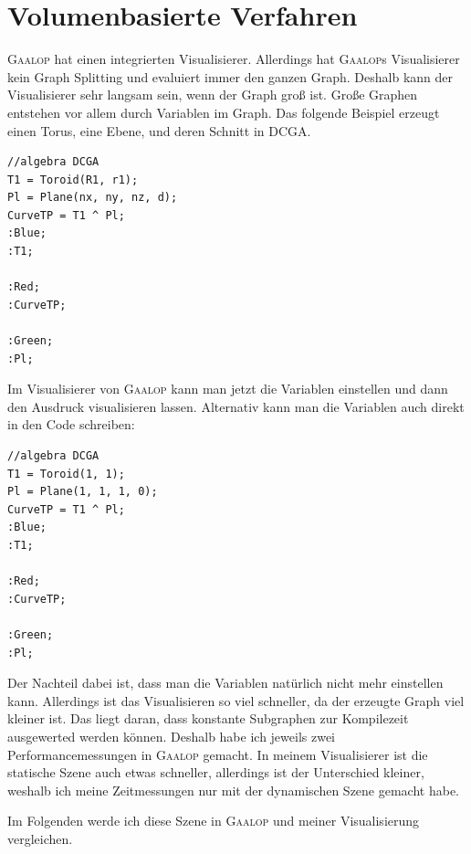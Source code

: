 \documentclass[
	ngerman,%
	accentcolor=9c,%
	ruledheaders=section,%
	class=report,%
	thesis={type=bachelor},%
	fontsize=11pt,%
	parskip=half-,%
	custommargins=true,%
	marginpar=false,%
]{tudapub}
\begin{document}
\section{Volumenbasierte Verfahren}
\textsc{Gaalop} hat einen integrierten Visualisierer. Allerdings hat \textsc{Gaalop}s Visualisierer kein Graph Splitting und evaluiert immer den ganzen Graph. Deshalb kann der Visualisierer sehr langsam sein, wenn der Graph groß ist. Große Graphen entstehen vor allem durch Variablen im Graph. Das folgende Beispiel erzeugt einen Torus, eine Ebene, und deren Schnitt in DCGA.
\begin{verbatim}
//algebra DCGA
T1 = Toroid(R1, r1);                
Pl = Plane(nx, ny, nz, d);    
CurveTP = T1 ^ Pl;     
:Blue;
:T1;

:Red;
:CurveTP;

:Green;
:Pl;     
\end{verbatim}
Im Visualisierer von \textsc{Gaalop} kann man jetzt die Variablen einstellen und dann den Ausdruck visualisieren lassen.
Alternativ kann man die Variablen auch direkt in den Code schreiben:
\begin{verbatim}
//algebra DCGA
T1 = Toroid(1, 1);                
Pl = Plane(1, 1, 1, 0);    
CurveTP = T1 ^ Pl;     
:Blue;
:T1;

:Red;
:CurveTP;

:Green;
:Pl;     
\end{verbatim}
Der Nachteil dabei ist, dass man die Variablen natürlich nicht mehr einstellen kann. Allerdings ist das Visualisieren so viel schneller, da der erzeugte Graph viel kleiner ist. Das liegt daran, dass konstante Subgraphen zur Kompilezeit ausgewerted werden können. Deshalb habe ich jeweils zwei Performancemessungen in \textsc{Gaalop} gemacht. In meinem Visualisierer ist die statische Szene auch etwas schneller, allerdings ist der Unterschied kleiner, weshalb ich meine Zeitmessungen nur mit der dynamischen Szene gemacht habe.

Im Folgenden werde ich diese Szene in \textsc{Gaalop} und meiner Visualisierung vergleichen.
\end{document}
